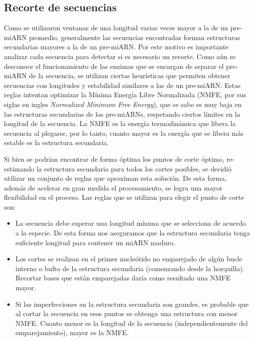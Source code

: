 \subsection{Recorte de secuencias}

Como se utilizaron ventanas de una longitud varias veces mayor a la de un pre-miARN promedio, generalmente las secuencias encontradas forman estructuras
secundarias mayores a la de un pre-miARN. Por este motivo es importante analizar cada secuencia para detectar si es necesario un recorte. Como aún se
desconoce el funcionamiento de las enzimas que se encargan de separar el pre-miARN de la secuencia, se utilizan ciertas heurísticas que permiten obtener
secuencias con longitudes y estabilidad similares a las de un pre-miARN. Estas reglas intentan optimizar la Mínima Energía Libre Normalizada (NMFE, por
sus siglas en ingles \textit{Normalized Minimum Free Energy}), que se sabe es muy baja en las estructuras secundarias de los pre-miARNs, respetando ciertos
límites en la longitud de la secuencia. La NMFE es la energía termodinámica que libera la secuencia al plegarse, por lo tanto, cuanto mayor es la energía
que se libera más estable es la estructura secundaria.

Si bien se podrían encontrar de forma óptima los puntos de corte óptimo, re-estimando la estructura secundaria para todos los cortes posibles, se decidió
utilizar un conjunto de reglas que aproximan esta solución. De esta forma, además de acelerar en gran medida el procesamiento, se logra una mayor
flexibilidad en el proceso. Las reglas que se utilizan para elegir el punto de corte son:

\begin{itemize}
	\item La secuencia debe superar una longitud mínima que se selecciona de acuerdo a la especie. De esta forma nos aseguramos que la estructura
		secundaria tenga suficiente longitud para contener un miARN maduro.
	\item Los cortes se realizan en el primer nucleótido no emparejado de algún bucle interno o bulto de la estructura secundaria (comenzando desde la
		horquilla). Recortar bases que están emparejadas daría como resultado una NMFE mayor.
	\item Si las imperfecciones en la estructura secundaria son grandes, es probable que al cortar la secuencia en esos puntos se obtenga una estructura
		con menor NMFE. Cuanto menor es la longitud de la secuencia (independientemente del emparejamiento), mayor es la NMFE.
\end{itemize}

